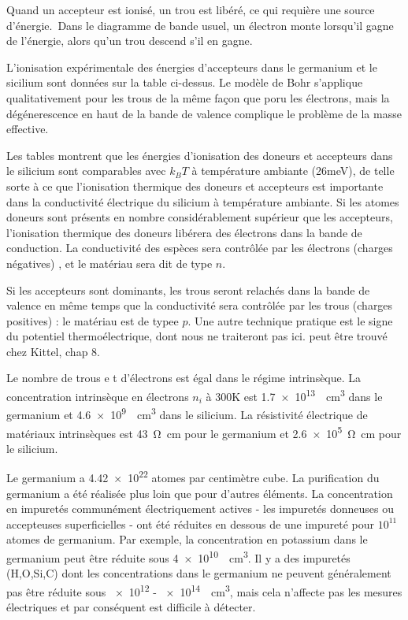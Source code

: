 Quand un accepteur est ionisé, un trou est libéré, ce qui requière une source
d'énergie. Dans le diagramme de bande usuel, un électron monte lorsqu'il gagne de
l'énergie, alors qu'un trou descend s'il en gagne.

L'ionisation expérimentale des énergies d'accepteurs dans le germanium et le
sicilium sont données sur la table ci-dessus. Le modèle de Bohr s'applique
qualitativement pour les trous de la même façon que poru les électrons, mais la
dégénerescence en haut de la bande de valence complique le problème de la masse
effective.

Les tables montrent que les énergies d'ionisation des doneurs et accepteurs dans
le silicium sont comparables avec $k_BT$ à température ambiante (26meV), de telle
sorte à ce que l'ionisation thermique des doneurs et accepteurs est importante
dans la conductivité électrique du silicium à température ambiante. Si les atomes
doneurs sont présents en nombre considérablement supérieur que les accepteurs,
l'ionisation thermique des doneurs libérera des électrons dans la bande de
conduction. La conductivité des espèces sera contrôlée par les électrons (charges
négatives) , et le matériau sera dit de type $n$.

Si les accepteurs sont dominants, les trous seront relachés dans la bande de
valence en même temps que la conductivité sera contrôlée par les trous (charges
positives) : le matériau est de typee $p$. Une autre technique pratique est le
signe du potentiel thermoélectrique, dont nous ne traiteront pas ici. peut être
trouvé chez Kittel, chap 8.

Le nombre de trous e t d'électrons est égal dans le régime intrinsèque. La
concentration intrinsèque en électrons $n_i$ à 300K est
\SI{1.7e13}{\per\cubic\centi\metre} dans le germanium et
\SI{4.6e9}{\per\cubic\centi\metre} dans le silicium. La résistivité électrique de
matériaux intrinsèques est \SI{43}{\ohm\centi\metre} pour le germanium et
\SI{2.6e5}{\ohm\centi\metre} pour le silicium.

Le germanium a \SI{4.42e22}{} atomes par centimètre cube. La purification du
germanium a été réalisée plus loin que pour d'autres éléments. La concentration
en impuretés communément électriquement actives - les impuretés donneuses ou
accepteuses superficielles - ont été réduites en dessous de une impureté pour
$10^11$ atomes de germanium. Par exemple, la concentration en potassium dans le
germanium peut être réduite sous \SI{4e10}{\per\cubic\centi\metre}. Il y a des
impuretés (H,O,Si,C) dont les concentrations dans le germanium ne peuvent
généralement pas être réduite sous \SI{e12}{} - \SI{e14}{\per\cubic\centi\metre},
mais cela n'affecte pas les mesures électriques et par conséquent est difficile à
détecter.

